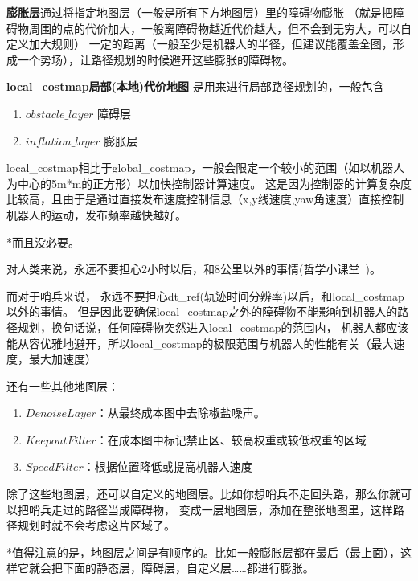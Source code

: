 \textbf{膨胀层}通过将指定地图层（一般是所有下方地图层）里的障碍物膨胀
（就是把障碍物周围的点的代价加大，一般离障碍物越近代价越大，但不会到无穷大，可以自定义加大规则）
一定的距离（一般至少是机器人的半径，但建议能覆盖全图，形成一个势场），让路径规划的时候避开这些膨胀的障碍物。

\textbf{local\_costmap局部(本地)代价地图} 是用来进行局部路径规划的，一般包含
\begin{enumerate}
    \item {$obstacle\_layer$} 障碍层
    \item {$inflation\_layer$} 膨胀层
\end{enumerate}
    local\_costmap相比于global\_costmap，一般会限定一个较小的范围（如以机器人为中心的5m*m的正方形）以加快控制器计算速度。
这是因为控制器的计算复杂度比较高，且由于是通过直接发布速度控制信息（x,y线速度,yaw角速度）直接控制机器人的运动，发布频率越快越好。

*而且没必要。

对人类来说，永远不要担心2小时以后，和8公里以外的事情(哲学小课堂~)。

而对于哨兵来说，
永远不要担心dt\_ref(轨迹时间分辨率)以后，和local\_costmap以外的事情。
但是因此要确保local\_costmap之外的障碍物不能影响到机器人的路径规划，换句话说，任何障碍物突然进入local\_costmap的范围内，
机器人都应该能从容优雅地避开，所以local\_costmap的极限范围与机器人的性能有关（最大速度，最大加速度）

还有一些其他地图层：
\begin{enumerate}
    \item $DenoiseLayer$：从最终成本图中去除椒盐噪声。
    \item $KeepoutFilter$：在成本图中标记禁止区、较高权重或较低权重的区域
    \item $SpeedFilter$：根据位置降低或提高机器人速度
\end{enumerate}
除了这些地图层，还可以自定义的地图层。比如你想哨兵不走回头路，那么你就可以把哨兵走过的路径当成障碍物，
变成一层地图层，添加在整张地图里，这样路径规划时就不会考虑这片区域了。

*值得注意的是，地图层之间是有顺序的。比如一般膨胀层都在最后（最上面），这样它就会把下面的静态层，障碍层，自定义层……都进行膨胀。
